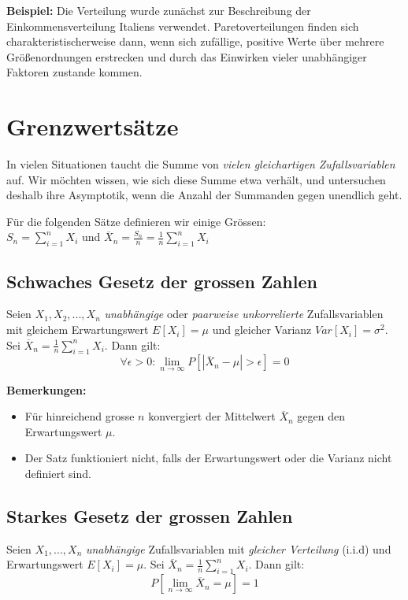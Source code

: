 \documentclass[10pt,a4paper,twocolumn]{article}
\begin{document}
\textbf{Beispiel:} Die Verteilung wurde zunächst zur Beschreibung der Einkommensverteilung Italiens verwendet. Paretoverteilungen finden sich charakteristischerweise dann, wenn sich zufällige, positive Werte über mehrere Größenordnungen erstrecken und durch das Einwirken vieler unabhängiger Faktoren zustande kommen.

\section{Grenzwertsätze}
In vielen Situationen taucht die Summe von \emph{vielen gleichartigen Zufallsvariablen} auf. Wir möchten wissen, wie sich diese Summe etwa verhält, und untersuchen deshalb ihre Asymptotik, wenn die Anzahl der Summanden gegen unendlich geht.

Für die folgenden Sätze definieren wir einige Grössen:\\
$S_n=\sum\limits_{i=1}^{n}X_i$ und $\overline{X}_n=\frac{S_n}{n}=\frac{1}{n}\sum\limits_{i=1}^{n}X_i$

\subsection{Schwaches Gesetz der grossen Zahlen}
Seien $X_1,X_2,...,X_n$ \emph{unabhängige} oder \emph{paarweise unkorrelierte} Zufallsvariablen mit gleichem Erwartungswert $E[X_i]=\mu$ und gleicher Varianz $Var[X_i]=\sigma^2$. Sei $\overline{X}_n=\frac{1}{n}\sum\nolimits_{i=1}^{n}X_i$. Dann gilt:
\[
\forall\epsilon>0:\lim_{n\to\infty}P\left[|\overline{X}_n-\mu|>\epsilon\right]=0
\]

\textbf{Bemerkungen:}
\begin{itemize}
\item Für hinreichend grosse $n$ konvergiert der Mittelwert $\overline{X}_n$ gegen den Erwartungswert $\mu$.
\item Der Satz funktioniert nicht, falls der Erwartungswert oder die Varianz nicht definiert sind.
\end{itemize}

\subsection{Starkes Gesetz der grossen Zahlen}
Seien $X_1,...,X_n$ \emph{unabhängige} Zufallsvariablen mit \emph{gleicher Verteilung} (i.i.d) und Erwartungswert $E[X_i]=\mu$. Sei $\overline{X}_n=\frac{1}{n}\sum\nolimits_{i=1}^{n}X_i$. Dann gilt:
\[
P\left[\lim_{n\to\infty}\overline{X}_n=\mu\right]=1
\]
\end{document}

